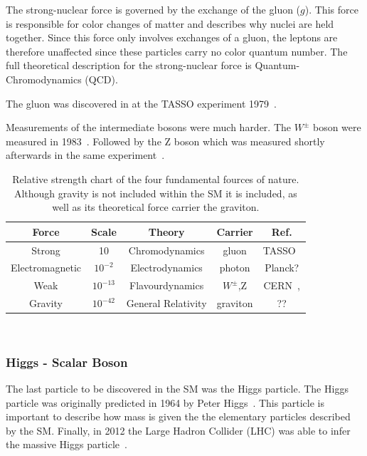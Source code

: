 The strong-nuclear force is governed by the exchange of the gluon ($g$).
This force is responsible for color changes of matter and describes why nuclei are held together.
Since this force only involves exchanges of a gluon, the leptons are therefore unaffected since these particles carry no color quantum number.
The full theoretical description for the strong-nuclear force is Quantum-Chromodynamics (QCD).

The gluon was discovered in at the TASSO experiment 1979~\citep{tasso_1978_BRANDELIK1979243, PETRA_PhysRevLett.43.830}.

Measurements of the intermediate bosons were much harder.
The $W^{\pm}$ boson were measured in 1983~\citep{wboson_measure_ARNISON1983103}.
Followed by the Z boson which was measured shortly afterwards in the same experiment~\citep{zboson_measure_1983398}.

\begin{table}
\begin{center}
\begin{tabular}{||c c c c c||}
 \hline
 Force & Scale & Theory & Carrier & Ref. \\ [0.5ex]
 \hline\hline
 Strong & 10 & Chromodynamics & gluon & TASSO~\citep{tasso_1978_BRANDELIK1979243} \\
 \hline
 Electromagnetic & $10^{-2} $ & Electrodynamics & photon & Planck? \\
 \hline
 Weak & $10^{-13}$ & Flavourdynamics & $W^{\pm}$,Z & CERN~\citep{wboson_measure_ARNISON1983103},\citep{zboson_measure_1983398}\\
 \hline
 Gravity & $10^{-42}$ & General Relativity & graviton  & ?? \\
 \hline
 \hline
\end{tabular}
\caption{Relative strength chart of the four fundamental fources of nature. Although gravity is not included within the SM it is included, as well as its theoretical force carrier the graviton.}
\end{center}
\end{table}
~\label{table:forces}

\subsubsection{Higgs - Scalar Boson}

The last particle to be discovered in the SM was the Higgs particle.
The Higgs particle was originally predicted in 1964 by Peter Higgs~\citep{HIGGS1964132}.
This particle is important to describe how mass is given the the elementary particles described by the SM.
Finally, in 2012 the Large Hadron Collider (LHC) was able to infer the massive Higgs particle~\citep{higgs_discovery_20121}.


